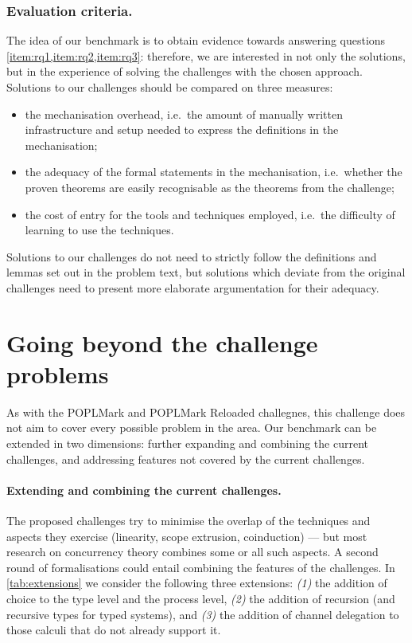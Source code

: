 \documentclass[runningheads]{llncs}
\begin{document}
\subsubsection{Evaluation criteria.}
The idea of our benchmark is to obtain evidence towards answering questions \cref{item:rq1,item:rq2,item:rq3}: therefore, we are interested in not only the solutions, but in the experience of solving the challenges with the chosen approach.
Solutions to our challenges should be compared on three measures:
\begin{itemize}
\item the mechanisation overhead, i.e.~the amount of manually written infrastructure and setup needed to express the definitions in the mechanisation; \item the adequacy of the formal statements in the mechanisation, i.e.~whether the proven theorems are easily recognisable as the theorems from the challenge; \item the cost of entry for the tools and techniques employed, i.e.~the difficulty of learning to use the techniques.
\end{itemize}
Solutions to our challenges do not need to strictly follow the definitions and lemmas set out in the problem text, but solutions which deviate from the original challenges need to present more elaborate argumentation for their adequacy.

\section{Going beyond the challenge problems}\label{sec:going-beyond}

As with the POPLMark and POPLMark Reloaded challegnes, this challenge does not aim to cover every possible
problem in the area. Our benchmark can be extended in two
dimensions: further expanding and combining the current challenges,
and addressing features not covered by the current challenges.

\vspace{-1mm}%
\paragraph{Extending and combining the current challenges.}
The proposed challenges try to minimise the overlap of the techniques
and aspects they exercise (linearity, scope extrusion, coinduction) --- but most
research on concurrency theory combines some or all such aspects. A second round of formalisations could
entail combining the features of the challenges.
In \cref{tab:extensions} we consider the following three extensions:
\emph{(1)} the addition of choice to the type level and the process level,
\emph{(2)} the addition of recursion (and recursive types for typed systems),
and \emph{(3)} the
addition of channel delegation to those calculi that do not already
support it.
\end{document}
